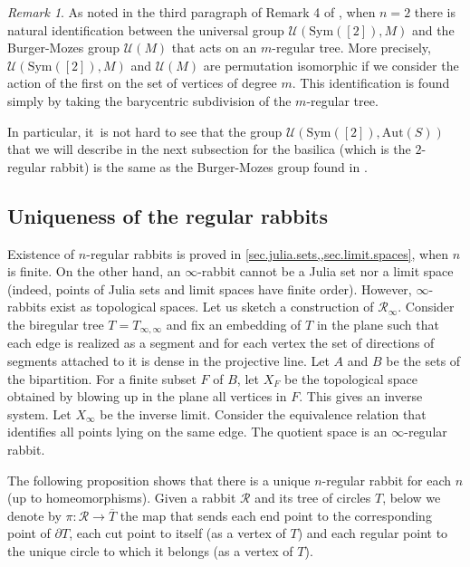 \documentclass[JEP,XML,SOM,Unicode,NoFloatCountersInSection,published]{cedram}
\theoremstyle{plain}
\theoremstyle{definition}
\theoremstyle{remark}
\newtheorem{remark}[theorem]{Remark}
\newcommand{\Aut}{\mathrm{Aut}}
\newcommand{\Sym}{\mathrm{Sym}}
\newcommand{\R}{\mathcal{R}}
\newcommand{\U}{\mathcal{U}}
\begin{document}
\begin{remark}
\label{rmk.BM.and.biregular}
As noted in the third paragraph of Remark 4 of \cite{biregular}, when $n=2$ there is natural identification between the universal group $\U(\Sym([2]),M)$ and the Burger-Mozes group $\U(M)$ that acts on an $m$-regular tree.
More precisely, $\U(\Sym([2]),M)$ and $\U(M)$ are permutation isomorphic if we consider the action of the first on the set of vertices of degree $m$.
This identification is found simply by taking the barycentric subdivision of the $m$-regular tree.

In particular, it~is not hard to see that the group $\U(\Sym([2]),\Aut(S))$ that we will describe in the next subsection for the basilica (which is the $2$-regular rabbit) is the same as the Burger-Mozes group found in \cite{Neretin}.
\end{remark}

\subsection{Uniqueness of the regular rabbits}

Existence of $n$-regular rabbits is proved in \cref{sec.julia.sets,,sec.limit.spaces}, when $n$ is finite.
On the other hand, an $\infty$-rabbit cannot be a Julia set nor a limit space (indeed, points of Julia sets and limit spaces have finite order).
However, $\infty$-rabbits exist as topological spaces.
Let us sketch a construction of $\R_\infty$.
Consider the biregular tree $T=T_{\infty,\infty}$ and fix an embedding of $T$ in the plane such that each edge is realized as a segment and for each vertex the set of directions of segments attached to it is dense in the projective line.
Let $A$ and $B$ be the sets of the bipartition.
For a finite subset $F$ of $B$, let $X_F$ be the topological space obtained by blowing up in the plane all vertices in $F$.
This gives an inverse system.
Let $X_\infty$ be the inverse limit.
Consider the equivalence relation that identifies all points lying on the same edge.
The quotient space is an $\infty$-regular rabbit.

The following proposition shows that there is a unique $n$-regular rabbit for each $n$ (up to homeomorphisms).
Given a rabbit $\R$ and its tree of circles $T$, below we denote by $\pi \colon \R \to \overline{T}$ the map that sends each end point to the corresponding point of $\partial T$, each cut point to itself (as a vertex of $T$) and each regular point to the unique circle to which it belongs (as a vertex of $T$).
\end{document}
